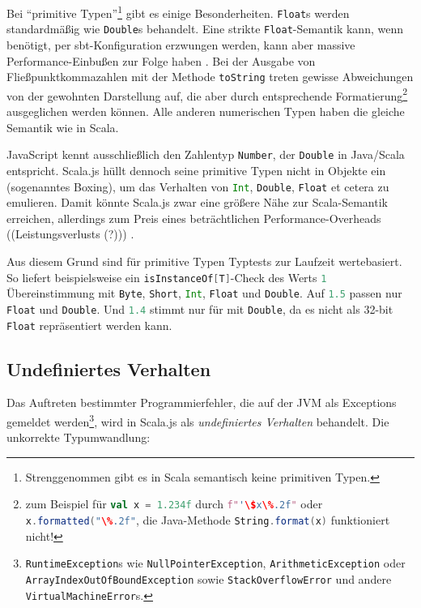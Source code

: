 \documentclass[a4paper, 12pt, hidelinks, listof=totoc, listoftables=totoc, bibliography=totoc]{scrreprt}
\newcommand{\scala}[1]{\lstinline[language=Scala, style=inline]|#1|}
\begin{document}
Bei "`primitive Typen"'\footnote{Strenggenommen gibt es in Scala semantisch keine primitiven Typen.} gibt es einige Besonderheiten. \scala{Float}s werden standardmäßig wie \scala{Double}s behandelt. Eine strikte \scala{Float}-Semantik kann, wenn benötigt, per sbt-Konfiguration erzwungen werden, kann aber massive Performance-Einbußen zur Folge haben \cite[S.~2]{doeraene2013.TDI}\cite{scalajs.DSS}. 
Bei der Ausgabe von Fließpunktkommazahlen mit der Methode \scala{toString} treten gewisse Abweichungen von der gewohnten Darstellung auf, die aber durch entsprechende Formatierung\footnote{zum Beispiel für \scala{val x = 1.234f} durch \scala{f"'\$x\%.2f"} oder \scala{x.formatted("\%.2f"}, die Java-Methode \scala{String.format(x)} funktioniert nicht!} ausgeglichen werden können. Alle anderen numerischen Typen haben die gleiche Semantik wie in Scala. 

JavaScript kennt ausschließlich den Zahlentyp \scala{Number}, der \scala{Double} in Java/Scala entspricht. Scala.js hüllt dennoch seine primitive Typen nicht in Objekte ein (sogenanntes Boxing), um das Verhalten von \scala{Int}, \scala{Double}, \scala{Float} et cetera zu emulieren. Damit könnte Scala.js zwar eine größere Nähe zur Scala-Semantik erreichen, allerdings zum Preis eines beträchtlichen Performance-Overheads ((Leistungsverlusts (?)))
\cite[S. 2]{doeraene2013.TDI}\cite[\#ThePerformance/CorrectnessTradeoff]{haoyi.HOS}.

Aus diesem Grund sind für primitive Typen Typtests zur Laufzeit wertebasiert. 
So liefert beispielsweise ein \scala{isInstanceOf[T]}-Check des Werts \scala{1} Übereinstimmung mit \scala{Byte}, \scala{Short}, \scala{Int}, \scala{Float} und \scala{Double}. Auf \scala{1.5} passen nur \scala{Float} und \scala{Double}. Und \scala{1.4} stimmt nur für mit \scala{Double}, da es nicht als 32-bit \scala{Float} repräsentiert werden kann.\cite{scalajs.DSS}


\subsection{Undefiniertes Verhalten}\label{subsec:undefined-behavior}

Das Auftreten bestimmter Programmierfehler, die auf der JVM als Exceptions gemeldet werden\footnote{\scala{RuntimeException}s wie \scala{NullPointerException}, \scala{ArithmeticException} oder \scala{ArrayIndexOutOfBoundException} sowie \scala{StackOverflowError} und andere \scala{VirtualMachineError}s.},
wird in Scala.js als \textit{undefiniertes Verhalten} behandelt. Die unkorrekte Typumwandlung:
\end{document}
